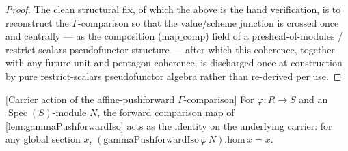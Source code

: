 \begin{proof}
  The clean structural fix, of which the above is the hand verification, is to reconstruct
  the \(\Gamma\)-comparison so that the value/scheme junction is crossed once and centrally
  — as the composition (\(\mathrm{map\_comp}\)) field of a presheaf-of-modules /
  restrict-scalars pseudofunctor structure — after which this coherence, together with any
  future unit and pentagon coherence, is discharged once at construction by pure
  restrict-scalars pseudofunctor algebra rather than re-derived per use.
\end{proof}

\begin{lemma}


[Carrier action of the affine-pushforward \(\Gamma\)-comparison]
  \label{lem:gammaPushforwardIso_hom_apply}
  For \(\varphi : R \to S\) and an \(\operatorname{Spec}(S)\)-module \(N\), the forward
  comparison map of \cref{lem:gammaPushforwardIso} acts as the identity on the underlying
  carrier: for any global section \(x\), \((\mathrm{gammaPushforwardIso}\,\varphi\,N).\mathrm{hom}\,x = x\).
\end{lemma}

